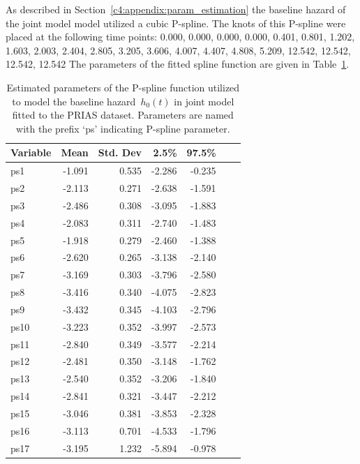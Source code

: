 \begin{subappendices}
As described in Section~\ref{c4:appendix:param_estimation} the baseline hazard of the joint model model utilized a cubic P-spline. The knots of this P-spline were placed at the following time points:
0.000, 0.000, 0.000, 0.000, 0.401, 0.801, 1.202, 1.603, 2.003, 2.404, 2.805, 3.205, 3.606, 4.007, 4.407, 4.808, 5.209, 12.542, 12.542, 12.542, 12.542
The parameters of the fitted spline function are given in Table~\ref{c4:tab:baseline_hazard}.
\begin{table}
\small
\centering
\caption{Estimated parameters of the P-spline function utilized to model the baseline hazard~$h_0(t)$ in joint model fitted to the PRIAS dataset. Parameters are named with the prefix `ps' indicating P-spline parameter.}
\label{c4:tab:baseline_hazard}
\begin{tabular}{lrrrrrr}
\toprule
Variable                         & Mean & Std. Dev & 2.5\%  & 97.5\%   \\
\midrule
ps1  & -1.091 & 0.535 & -2.286 & -0.235 \\
ps2  & -2.113 & 0.271 & -2.638 & -1.591 \\
ps3  & -2.486 & 0.308 & -3.095 & -1.883 \\
ps4  & -2.083 & 0.311 & -2.740 & -1.483 \\
ps5  & -1.918 & 0.279 & -2.460 & -1.388 \\
ps6  & -2.620 & 0.265 & -3.138 & -2.140 \\
ps7  & -3.169 & 0.303 & -3.796 & -2.580 \\
ps8  & -3.416 & 0.340 & -4.075 & -2.823 \\
ps9  & -3.432 & 0.345 & -4.103 & -2.796 \\
ps10 & -3.223 & 0.352 & -3.997 & -2.573 \\
ps11 & -2.840 & 0.349 & -3.577 & -2.214 \\
ps12 & -2.481 & 0.350 & -3.148 & -1.762 \\
ps13 & -2.540 & 0.352 & -3.206 & -1.840 \\
ps14 & -2.841 & 0.321 & -3.447 & -2.212 \\
ps15 & -3.046 & 0.381 & -3.853 & -2.328 \\
ps16 & -3.113 & 0.701 & -4.533 & -1.796 \\
ps17 & -3.195 & 1.232 & -5.894 & -0.978 \\
\bottomrule
\end{tabular}
\end{table}


\end{subappendices}
